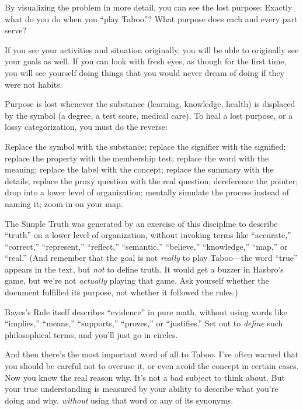 {
 By visualizing the problem in more detail, you can see the lost
purpose: Exactly what do you do when you ``play
Taboo''? What purpose does each and every part
serve?}

{
 If you see your activities and situation originally, you will be
able to originally see your goals as well. If you can look with fresh
eyes, as though for the first time, you will see yourself doing things
that you would never dream of doing if they were not habits.}

{
 Purpose is lost whenever the substance (learning, knowledge,
health) is displaced by the symbol (a degree, a test score, medical
care). To heal a lost purpose, or a lossy categorization, you must do
the reverse:}

{
 Replace the symbol with the substance; replace the signifier with
the signified; replace the property with the membership test; replace
the word with the meaning; replace the label with the concept; replace
the summary with the details; replace the proxy question with the real
question; dereference the pointer; drop into a lower level of
organization; mentally simulate the process instead of naming it; zoom
in on your map.}

{
 The Simple Truth was generated by an exercise of this discipline
to describe ``truth'' on a lower
level of organization, without invoking terms like
``accurate,''
``correct,''
``represent,''
``reflect,''
``semantic,''
``believe,''
``knowledge,''
``map,'' or
``real.'' (And remember that the
goal is not \textit{really} to play Taboo---the word
``true'' appears in the text, but
\textit{not} to define truth. It would get a buzzer in
Hasbro's game, but we're not
\textit{actually} playing that game. Ask yourself whether the document
fulfilled its purpose, not whether it followed the rules.)}

{
 Bayes's Rule itself describes
``evidence'' in pure math, without
using words like ``implies,''
``means,''
``supports,''
``proves,'' or
``justifies.'' Set out to
\textit{define} such philosophical terms, and you'll
just go in circles.}

{
 And then there's the most important word of all to
Taboo. I've often warned that you should be careful not
to overuse it, or even avoid the concept in certain cases. Now you know
the real reason why. It's not a bad subject to think
about. But your true understanding is measured by your ability to
describe what you're doing and why, \textit{without}
using that word or any of its synonyms.}

